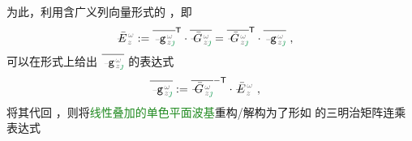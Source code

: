 为此，利用含广义列向量形式的 ，即
\begin{align} \label{eq:vec-amp_eigenmode-matrix}
	\Xint{\mathcolor{gray}{-}}{30}{\bar{E}}^{\;\!\mathcolor{gray}{\omega}}_{\;\! \mathcolor{gray}{z}} &:= \overline{\Xint{\begin{smallmatrix} ~ \\ {}^{}_{\mathcolor{gray}{-}} \\ ~ \end{smallmatrix}}{09}{\mathtt{g}}^{\;\!\mathcolor{gray}{\omega}}_{\;\! \mathcolor{gray}{z} \textcolor{ForestGreen}{\jmath}}}^\mathsf{T} \cdot \overline{\Xint{\mathcolor{gray}{-}}{20}{\bar{G}}^{\;\!\mathcolor{gray}{\omega}}_{\;\! \mathcolor{gray}{z} \textcolor{ForestGreen}{\jmath}}} = \overline{\Xint{\mathcolor{gray}{-}}{20}{\bar{G}}^{\;\!\mathcolor{gray}{\omega}}_{\;\! \mathcolor{gray}{z} \textcolor{ForestGreen}{\jmath}}}^\mathsf{T} \cdot \overline{\Xint{\begin{smallmatrix} ~ \\ {}^{}_{\mathcolor{gray}{-}} \\ ~ \end{smallmatrix}}{09}{\mathtt{g}}^{\;\!\mathcolor{gray}{\omega}}_{\;\! \mathcolor{gray}{z} \textcolor{ForestGreen}{\jmath}}} ~,
\end{align}
可以在形式上给出 $\overline{\Xint{\begin{smallmatrix} ~ \\ {}^{}_{\mathcolor{gray}{-}} \\ ~ \end{smallmatrix}}{09}{\mathtt{g}}^{\;\!\mathcolor{gray}{\omega}}_{\;\! \mathcolor{gray}{z} \textcolor{ForestGreen}{\jmath}}}$ 的表达式
\begin{align} \label{eq:amp_vec}
	\overline{\Xint{\begin{smallmatrix} ~ \\ {}^{}_{\mathcolor{gray}{-}} \\ ~ \end{smallmatrix}}{09}{\mathtt{g}}^{\;\!\mathcolor{gray}{\omega}}_{\;\! \mathcolor{gray}{z} \textcolor{ForestGreen}{\jmath}}} &:= \overline{\Xint{\mathcolor{gray}{-}}{20}{\bar{G}}^{\;\!\mathcolor{gray}{\omega}}_{\;\! \mathcolor{gray}{z} \textcolor{ForestGreen}{\jmath}}}^\mathsf{-T} \cdot \Xint{\mathcolor{gray}{-}}{30}{\bar{E}}^{\;\!\mathcolor{gray}{\omega}}_{\;\! \mathcolor{gray}{z}} ~,
\end{align}
将其代回 ，则将\textcolor{ForestGreen}{线性叠加的单色平面波基}重构/解构为了形如  的三明治矩阵连乘表达式

